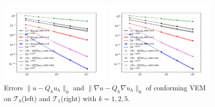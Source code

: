 \documentclass[notheorems,serif]{beamer}
\begin{document}
\begin{CJK}{UTF8}{gkai}
\begin{frame}
\begin{figure}[htbp]
\centering
\begin{minipage}[t]{0.49\linewidth}
\centering
\includegraphics[width=5.5cm]{../figures/stabfree/cvem_convex.pdf}
\end{minipage}%
\begin{minipage}[t]{0.49\linewidth}
\centering
\includegraphics[width=5.5cm]{../figures/stabfree/cvem_nonconvex.pdf}
\end{minipage}%
\centering
\caption{Errors $\|u - Q_h u_h\|_0$ and $\|\nabla u - Q_{h}\nabla u_h\|_0$
of conforming VEM on $\mathcal T_0$(left) and
$\mathcal T_1$(right) with $k=1, 2, 5$.}
\label{fig:rate2}
\end{figure}

\end{frame}


\end{CJK}
\end{document}
